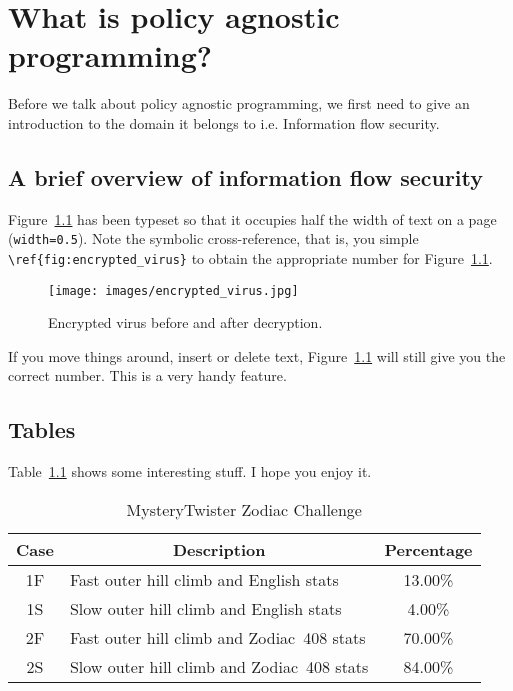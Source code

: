 \chapter{What is policy agnostic programming?\label{chap:PAP}}

Before we talk about policy agnostic programming, we first need to give an
introduction to the domain it belongs to i.e. Information flow security.

\section{A brief overview of information flow security}

Figure~\ref{fig:encrypted_virus} has been typeset so that it
occupies half the width of text on a page ({\tt width=0.5}). Note the
symbolic cross-reference, that is, you simple \verb+\ref{fig:encrypted_virus}+
to obtain the appropriate number for Figure~\ref{fig:encrypted_virus}.

\begin{figure}[htb]
\centering
\texttt{[image: images/encrypted\_virus.jpg]}
\caption{Encrypted virus before and after decryption.}
\label{fig:encrypted_virus}
\end{figure}

If you move things around, insert or delete text, Figure~\ref{fig:encrypted_virus}
will still give you the correct number. This is a very handy feature.


\section{Tables}

Table~\ref{tab:19}
shows some interesting stuff. I hope you enjoy it.

\begin{table}[htb]
\caption{MysteryTwister Zodiac Challenge\label{tab:19}}
\begin{center}
\begin{tabular}{c|lc}\hline\hline
Case & \multicolumn{1}{c}{Description} & Percentage\\ \hline
1F & Fast outer hill climb and English stats & 13.00\% \\
1S & Slow outer hill climb and English stats & \phantom{0}4.00\% \\
2F & Fast outer hill climb and Zodiac~408 stats & 70.00\% \\
2S & Slow outer hill climb and Zodiac~408 stats & 84.00\% \\ \hline\hline
\end{tabular}
\end{center}
\end{table}


